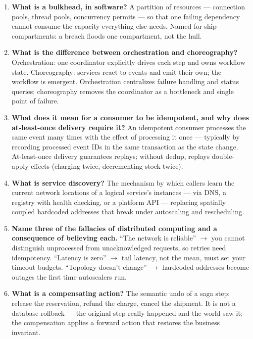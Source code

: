 \begin{enumerate}[label=\textbf{Q\arabic*.}, leftmargin=1.6cm]
  \item \textbf{What is a bulkhead, in software?}
        A partition of resources --- connection pools, thread pools,
        concurrency permits --- so that one failing dependency cannot
        consume the capacity everything else needs. Named for ship
        compartments: a breach floods one compartment, not the hull.
  \item \textbf{What is the difference between orchestration and
        choreography?}
        Orchestration: one coordinator explicitly drives each step and owns
        workflow state. Choreography: services react to events and emit
        their own; the workflow is emergent. Orchestration centralizes
        failure handling and status queries; choreography removes the
        coordinator as a bottleneck and single point of failure.
  \item \textbf{What does it mean for a consumer to be idempotent, and why
        does at-least-once delivery require it?}
        An idempotent consumer processes the same event many times with the
        effect of processing it once --- typically by recording processed
        event IDs in the same transaction as the state change. At-least-once
        delivery guarantees replays; without dedup, replays double-apply
        effects (charging twice, decrementing stock twice).
  \item \textbf{What is service discovery?}
        The mechanism by which callers learn the current network locations
        of a logical service's instances --- via DNS, a registry with
        health checking, or a platform API --- replacing spatially coupled
        hardcoded addresses that break under autoscaling and rescheduling.
  \item \textbf{Name three of the fallacies of distributed computing and a
        consequence of believing each.}
        ``The network is reliable'' $\to$ you cannot distinguish
        unprocessed from unacknowledged requests, so retries need
        idempotency. ``Latency is zero'' $\to$ tail latency, not the mean,
        must set your timeout budgets. ``Topology doesn't change'' $\to$
        hardcoded addresses become outages the first time autoscalers run.
  \item \textbf{What is a compensating action?}
        The semantic undo of a saga step: release the reservation, refund
        the charge, cancel the shipment. It is not a database rollback ---
        the original step really happened and the world saw it; the
        compensation applies a forward action that restores the business
        invariant.
\end{enumerate}

